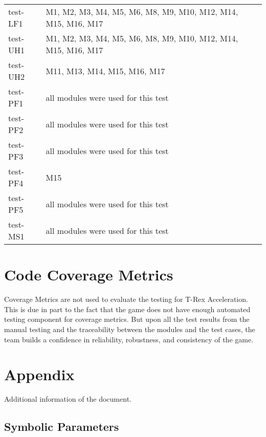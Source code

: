 \documentclass[12pt, titlepage]{article}
\begin{document}
\begin{table}[h!]
{\begin{tabular}{p{} p{}}
test-LF1 & M1, M2, M3, M4, M5, M6, M8, M9, M10, M12, M14, M15, M16, M17\\
test-UH1 & M1, M2, M3, M4, M5, M6, M8, M9, M10, M12, M14, M15, M16, M17\\
test-UH2 & M11, M13, M14, M15, M16, M17\\
test-PF1 & all modules were used for this test\\
test-PF2 & all modules were used for this test\\
test-PF3 & all modules were used for this test\\
test-PF4 & M15\\
test-PF5 & all modules were used for this test\\
test-MS1 & all modules were used for this test\\
\bottomrule
\end{tabular}}
\end{table}

\newpage


\section{Code Coverage Metrics}
Coverage Metrics are not used to evaluate the testing for T-Rex Acceleration. This is due in part to the fact that the game does not have enough automated testing component for coverage metrics. But upon all the test results from the manual testing and the traceability between the modules and the test cases, the team builds a confidence in reliability, robustness, and consistency of the game.

\section{Appendix}
Additional information of the document.

\subsection{Symbolic Parameters}
\end{document}
